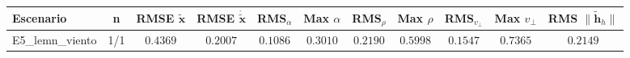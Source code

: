 \begin{tabular}{lcccccccccc}
\toprule
Escenario & n & RMSE $\tilde{\mathbf{x}}$ & RMSE $\dot{\tilde{\mathbf{x}}}$ & RMS$_\alpha$ & Max $\alpha$ & RMS$_\rho$ & Max $\rho$ & RMS$_{v_\perp}$ & Max $v_\perp$ & RMS $\|\tilde{\mathbf{h}}_h\|$ \\
\midrule
E5\_lemn\_viento & 1/1 & $0.4369$ & $0.2007$ & $0.1086$ & $0.3010$ & $0.2190$ & $0.5998$ & $0.1547$ & $0.7365$ & $0.2149$ \\
\bottomrule
\end{tabular}
